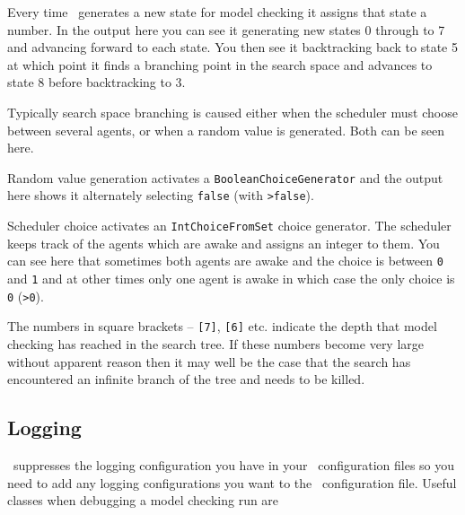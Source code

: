 \documentclass[a4]{article}
\begin{document}
Every time \jpf\ generates a new state for model checking it assigns that state a number.  In the output here you can see it generating new states 0 through to 7 and advancing forward to each state.  You then see it backtracking back to state 5 at which point it finds a branching point in the search space and advances to state 8 before backtracking to 3.

Typically search space branching is caused either when the scheduler must choose between several agents, or when a random value is generated.  Both can be seen here.

Random value generation activates a \texttt{BooleanChoiceGenerator} and the output here shows it alternately selecting  \texttt{false} (with \texttt{>false}).

Scheduler choice activates an \texttt{IntChoiceFromSet} choice generator.  The scheduler keeps track of the agents which are awake and assigns an integer to them.  You can see here that sometimes both agents are awake and the choice is between \texttt{0} and \texttt{1} and at other times only one agent is awake in which case the only choice is \texttt{0} (\texttt{>0}).

The numbers in square brackets -- \texttt{[7]}, \texttt{[6]} etc. indicate the depth that model checking has reached in the search tree.  If these numbers become very large without apparent reason then it may well be the case that the search has encountered an infinite branch of the tree and needs to be killed.

\subsection{Logging}
\jpf\ suppresses the logging configuration you have in your \ail\ configuration files so you need to add any logging configurations you want to the \jpf\ configuration file.  Useful classes when debugging a model checking run are
\end{document}
